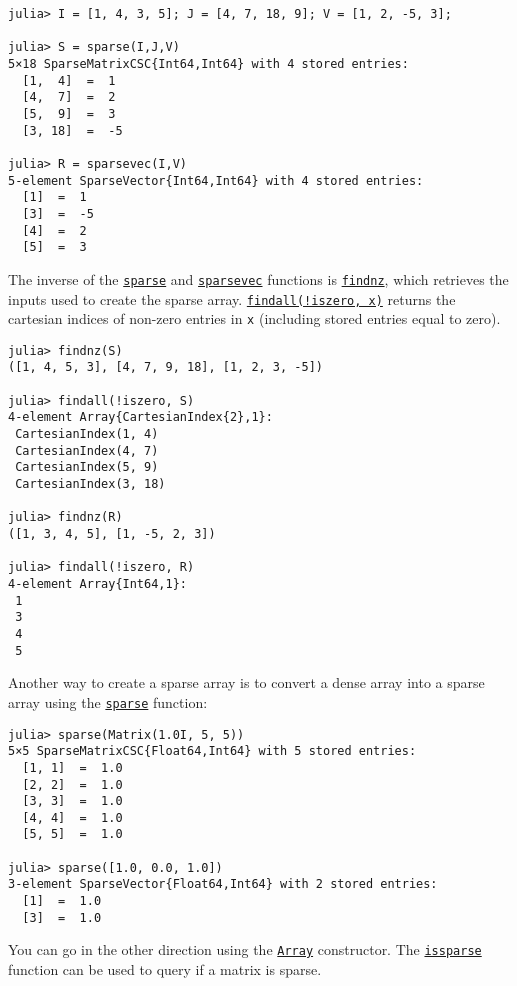 \begin{verbatim}
julia> I = [1, 4, 3, 5]; J = [4, 7, 18, 9]; V = [1, 2, -5, 3];

julia> S = sparse(I,J,V)
5×18 SparseMatrixCSC{Int64,Int64} with 4 stored entries:
  [1,  4]  =  1
  [4,  7]  =  2
  [5,  9]  =  3
  [3, 18]  =  -5

julia> R = sparsevec(I,V)
5-element SparseVector{Int64,Int64} with 4 stored entries:
  [1]  =  1
  [3]  =  -5
  [4]  =  2
  [5]  =  3
\end{verbatim}



The inverse of the \hyperlink{10167157011990389788}{\texttt{sparse}} and \hyperlink{13364181309585533450}{\texttt{sparsevec}} functions is \hyperlink{15430174447643444721}{\texttt{findnz}}, which retrieves the inputs used to create the sparse array. \hyperlink{16067208921941164599}{\texttt{findall(!iszero, x)}} returns the cartesian indices of non-zero entries in \texttt{x} (including stored entries equal to zero).




\begin{verbatim}
julia> findnz(S)
([1, 4, 5, 3], [4, 7, 9, 18], [1, 2, 3, -5])

julia> findall(!iszero, S)
4-element Array{CartesianIndex{2},1}:
 CartesianIndex(1, 4)
 CartesianIndex(4, 7)
 CartesianIndex(5, 9)
 CartesianIndex(3, 18)

julia> findnz(R)
([1, 3, 4, 5], [1, -5, 2, 3])

julia> findall(!iszero, R)
4-element Array{Int64,1}:
 1
 3
 4
 5
\end{verbatim}



Another way to create a sparse array is to convert a dense array into a sparse array using the \hyperlink{10167157011990389788}{\texttt{sparse}} function:




\begin{verbatim}
julia> sparse(Matrix(1.0I, 5, 5))
5×5 SparseMatrixCSC{Float64,Int64} with 5 stored entries:
  [1, 1]  =  1.0
  [2, 2]  =  1.0
  [3, 3]  =  1.0
  [4, 4]  =  1.0
  [5, 5]  =  1.0

julia> sparse([1.0, 0.0, 1.0])
3-element SparseVector{Float64,Int64} with 2 stored entries:
  [1]  =  1.0
  [3]  =  1.0
\end{verbatim}



You can go in the other direction using the \hyperlink{15492651498431872487}{\texttt{Array}} constructor. The \hyperlink{14062776301471954766}{\texttt{issparse}} function can be used to query if a matrix is sparse.




